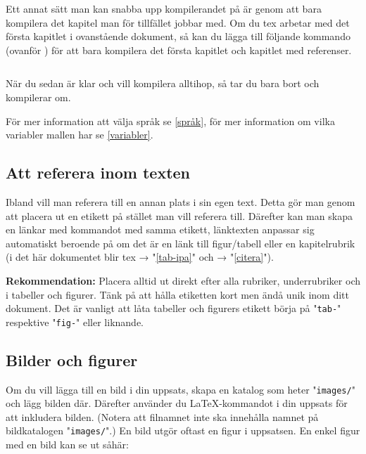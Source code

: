 Ett annat sätt man kan snabba upp kompilerandet på är genom att bara kompilera
det kapitel man för tillfället jobbar med. Om du tex arbetar med det första
kapitlet i ovanstående dokument, så kan du lägga till följande kommando
(ovanför ) för att bara kompilera det första
kapitlet och kapitlet med referenser.

\begin{verbatim}

\end{verbatim}

När du sedan är klar och vill kompilera alltihop, så tar du bara bort
 och kompilerar om.

För mer information att välja språk se \autoref{språk}, för mer information om
vilka  variabler mallen har se \autoref{variabler}.


\subsection{Att referera inom texten}
\label{länkar}

Ibland vill man referera till en annan plats i sin egen text. Detta gör man
genom att placera ut en etikett  på stället man vill referera
till. Därefter kan man skapa en länkar med kommandot  med
samma etikett, länktexten anpassar sig automatiskt beroende på om det är en
länk till figur/tabell eller en kapitelrubrik (i det här dokumentet blir tex
 → "\autoref{tab-ipa}" och
 → "\autoref{citera}").

\textbf{Rekommendation:} Placera alltid ut  direkt efter alla
rubriker, underrubriker och  i tabeller och figurer. Tänk
på att hålla etiketten kort men ändå unik inom ditt dokument. Det är vanligt
att låta tabeller och figurers etikett börja på "\texttt{tab-}" respektive
"\texttt{fig-}" eller liknande.


\subsection{Bilder och figurer}
\label{bilder}

Om du vill lägga till en bild i din uppsats, skapa en katalog som heter
"\texttt{images/}" och lägg bilden där. Därefter använder du \LaTeX{}-kommandot
 i din uppsats för att inkludera bilden.
(Notera att filnamnet inte ska innehålla namnet på bildkatalogen
"\texttt{images/}".) En bild utgör oftast en figur i uppsatsen. En enkel figur
med en bild kan se ut såhär:

